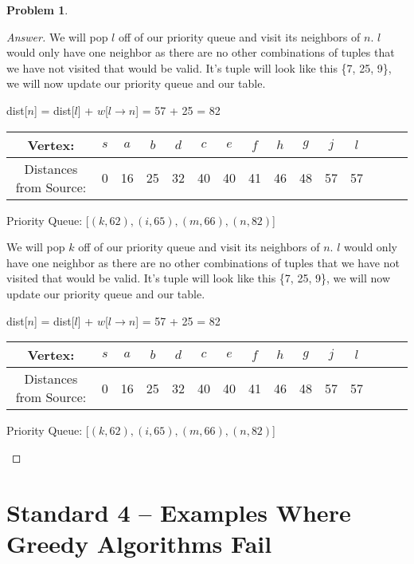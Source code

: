 \documentclass[11pt]{article}
\theoremstyle{definition}
\theoremstyle{definition}
\newtheorem{required}{Problem}
\theoremstyle{definition}
\begin{document}
\begin{required}
\begin{enumerate}[label=(\alph*)]
\begin{proof}[Answer]
We will pop $l$ off of our priority queue and visit its neighbors of $n$. $l$ would only have one neighbor as there are no other combinations of tuples that we have not visited that would be valid. It's tuple will look like this \{7, 25, 9\}, we will now update our priority queue and our table.
\begin{center}
dist[$n$] = dist[$l$]  + $w$[$l \rightarrow n$] = 57 + 25 = 82 \\
\begin{tabular}{ | c | c | c | c | c | c | c | c | c | c | c | c | c | c | c |}
 \hline
 Vertex:& $s$ & $a$ & $b$ & $d$ & $c$ & $e$ & $f$ & $h$ & $g$ & $j$ & $l$\\ 
 \hline
 Distances from Source:& 0 & 16 & 25 & 32 & 40 & 40 & 41 & 46 & 48 & 57 & 57 \\  
 \hline
\end{tabular}
\end{center}
\begin{center}
Priority Queue: [$(k,62), (i, 65), (m, 66), (n, 82)$]
\end{center}

We will pop $k$ off of our priority queue and visit its neighbors of $n$. $l$ would only have one neighbor as there are no other combinations of tuples that we have not visited that would be valid. It's tuple will look like this \{7, 25, 9\}, we will now update our priority queue and our table.
\begin{center}
dist[$n$] = dist[$l$]  + $w$[$l \rightarrow n$] = 57 + 25 = 82 \\
\begin{tabular}{ | c | c | c | c | c | c | c | c | c | c | c | c | c | c | c |}
 \hline
 Vertex:& $s$ & $a$ & $b$ & $d$ & $c$ & $e$ & $f$ & $h$ & $g$ & $j$ & $l$\\ 
 \hline
 Distances from Source:& 0 & 16 & 25 & 32 & 40 & 40 & 41 & 46 & 48 & 57 & 57 \\  
 \hline
\end{tabular}
\end{center}
\begin{center}
Priority Queue: [$(k,62), (i, 65), (m, 66), (n, 82)$]
\end{center}

	\end{proof}
\end{enumerate}
\end{required}

\clearpage
\section{Standard 4 -- Examples Where Greedy Algorithms Fail}
\end{document}
